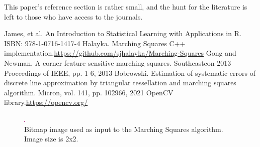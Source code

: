 \documentclass[12pt]{article}
\begin{document}
This paper's reference section is rather small, and the hunt for the literature is left to those who have access to the journals.



\pagebreak




\begin{thebibliography}{9}

 James, et al. An Introduction to Statistical Learning with Applications in R. ISBN: 978-1-0716-1417-4
 Halayka. Marching Squares C++ implementation.\newline \url{https://github.com/sjhalayka/Marching-Squares}
 Gong and Newman. A corner feature sensitive marching squares. Southeastcon 2013 Proceedings of IEEE, pp. 1-6, 2013
 Bobrowski. Estimation of systematic errors of discrete line approximation by triangular tessellation and marching squares algorithm. Micron, vol. 141, pp. 102966, 2021
 OpenCV library.\newline \url{https://opencv.org/}


\end{thebibliography}



\pagebreak





\begin{figure} 
\centering
  \includegraphics[width = 3 in]{2_res_image.png}
  \caption{Bitmap image used as input to the Marching Squares algorithm.
Image size is 2x2.
}
\end{figure}
\end{document}
